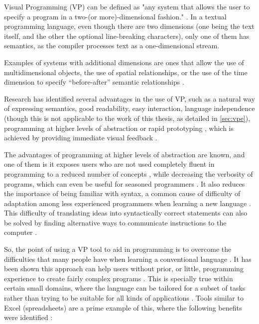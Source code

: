 Visual Programming (VP) can be defined as "any system that allows the user to specify a program in a
two-(or more)-dimensional fashion." \cite{Myers1986}.
In a textual programming language, even though there are two dimensions (one
being the text itself, and the other the optional line-breaking characters),
only one of them has semantics, as the compiler processes text as a
one-dimensional stream.

Examples of systems with additional dimensions are ones that allow the use of
multidimensional objects, the use of spatial relationships, or the use of the
time dimension to specify “before-after” semantic relationships \cite{Burnett1999}.

Research has identified several advantages in the use of VP, such as a natural
way of expressing semantics, good readability, easy interaction, language independence (though
this is not applicable to the work of this thesis, as detailed in \ref{sec:vpe}),
programming at higher levels of abstraction or rapid prototyping \cite{JamalRahmanandWenzel2014},
which is achieved by providing immediate visual feedback \cite{Shu1988}.

The advantages of programming at higher levels of abstraction are known, and
one of them is it exposes users who are not used completely fluent in programming
to a reduced number of concepts \cite{Shu1988}, while decreasing the verbosity of
programs, which can even be useful for seasoned programmers \cite{Myers1990}.
It also reduces the importance of being familiar with syntax, a common cause
of difficulty of adaptation among less experienced programmers when learning
a new language \cite{cunniff1986does}\cite{Carlisle2005}. This difficulty of translating ideas
into syntactically correct statements can also be solved by finding alternative
ways to communicate instructions to the computer \cite{Kelleher2005}.

So, the point of using a VP tool to aid in programming is to overcome the
difficulties that many people have when learning a conventional language
\cite{Lewis1987}. It has been shown this approach can help users without prior, or little,
programming experience to create fairly complex programs \cite{Halbert1984}.
This is specially true within certain small domains, where the language can be
tailored for a subset of tasks rather than trying to be suitable for all kinds
of applications \cite{Kelleher2005}. Tools similar to Excel (spreadsheets) are a prime example of this, where the following
benefits were identified \cite{ambler1987forms}\cite{Lewis1987}:


